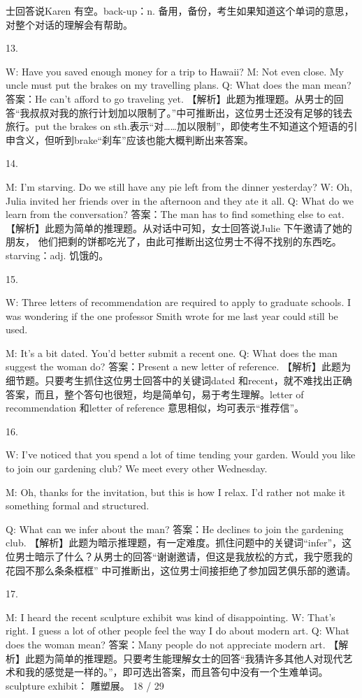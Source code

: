 \documentclass[UTF8,11pt]{ctexart}
\begin{document}
士回答说Karen 有空。back-up：n. 备用，备份，考生如果知道这个单词的意思，对整个对话的理解会有帮助。


13.


W: Have you saved enough money for a trip to Hawaii? M: Not even close. My uncle must put the brakes on my travelling plans. Q: What does the man mean? 答案：He can’t afford to go traveling yet. 【解析】此题为推理题。从男士的回答“我叔叔对我的旅行计划加以限制了。”中可推断出，这位男士还没有足够的钱去旅行。put the brakes on sth.表示“对……加以限制”，即使考生不知道这个短语的引申含义，但听到brake“刹车”应该也能大概判断出来答案。


14.


M: I’m starving. Do we still have any pie left from the dinner yesterday? W: Oh, Julia invited her friends over in the afternoon and they ate it all. Q: What do we learn from the conversation? 答案：The man has to find something else to eat. 【解析】此题为简单的推理题。从对话中可知，女士回答说Julie 下午邀请了她的朋友， 他们把剩的饼都吃光了，由此可推断出这位男士不得不找别的东西吃。starving：adj. 饥饿的。


15.


W: Three letters of recommendation are required to apply to graduate schools. I was wondering if the one professor Smith wrote for me last year could still be used.


M: It’s a bit dated. You’d better submit a recent one. Q: What does the man suggest the woman do? 答案：Present a new letter of reference. 【解析】此题为细节题。只要考生抓住这位男士回答中的关键词dated 和recent，就不难找出正确答案，而且，整个答句也很短，均是简单句，易于考生理解。letter of recommendation 和letter of reference 意思相似，均可表示“推荐信”。


16.


W: I’ve noticed that you spend a lot of time tending your garden. Would you like to join our gardening club? We meet every other Wednesday.


M: Oh, thanks for the invitation, but this is how I relax. I’d rather not make it something formal and structured.


Q: What can we infer about the man? 答案：He declines to join the gardening club. 【解析】此题为暗示推理题，有一定难度。抓住问题中的关键词“infer”，这位男士暗示了什么？从男士的回答“谢谢邀请，但这是我放松的方式，我宁愿我的花园不那么条条框框” 中可推断出，这位男士间接拒绝了参加园艺俱乐部的邀请。


17.


M: I heard the recent sculpture exhibit was kind of disappointing. W: That’s right. I guess a lot of other people feel the way I do about modern art. Q: What does the woman mean? 答案：Many people do not appreciate modern art. 【解析】此题为简单的推理题。只要考生能理解女士的回答“我猜许多其他人对现代艺术和我的感觉是一样的。”，即可选出答案，而且答句中没有一个生难单词。sculpture exhibit： 雕塑展。 18 / 29
\end{document}
